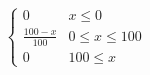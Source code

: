 \[ \begin{cases}
  0 & x\leq 0 \\
  \frac{100-x}{100} & 0\leq x\leq 100 \\
  0 & 100\leq x
\end{cases}
\]
